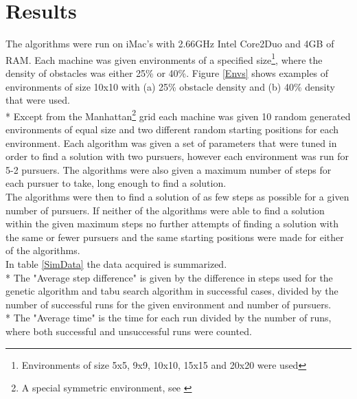 \chapter{Results}
The algorithms were run on iMac's with 2.66GHz Intel Core2Duo and 4GB of RAM. Each machine was given environments of a specified size\footnote{Environments of size 5x5, 9x9, 10x10, 15x15 and 20x20 were used}, where the density of obstacles was either 25\% or 40\%. Figure \ref{Envs} shows examples of environments of size 10x10 with (a) 25\% obstacle density and (b) 40\% density that were used.\\*
Except from the Manhattan\footnote{A special symmetric environment, see \cite{paper1}} grid each machine was given 10 random generated environments of equal size and two different random starting positions for each environment. Each algorithm was given a set of parameters that were tuned in order to find a solution with two pursuers, however each environment was run for 5-2 pursuers. The algorithms were also given a maximum number of steps for each pursuer to take, long enough to find a solution.\\
The algorithms were then to find a solution of as few steps as possible for a given number of pursuers. If neither of the algorithms were able to find a solution within the given maximum steps no further attempts of finding a solution with the same or fewer pursuers and the same starting positions were made for either of the algorithms.\\
In table \ref{SimData} the data acquired is summarized.\\*
The "Average step difference" is given by the difference in steps used for the genetic algorithm and tabu search algorithm in successful cases, divided by the number of successful runs for the given environment and number of pursuers.\\*
The "Average time" is the time for each run divided by the number of runs, where both successful and unsuccessful runs were counted.
\begin{center}
\begin{table}[t!hb]
\noindent{}
\caption{Data from simulations}
\label{SimData}
\end{table}
\end{center}
